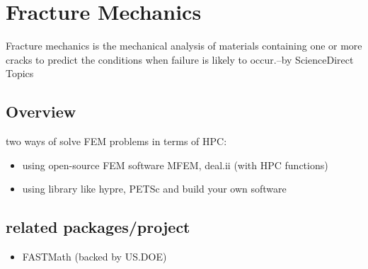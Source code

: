 \section{Fracture Mechanics } 
Fracture mechanics is the mechanical analysis of materials containing one or more cracks to predict the conditions when failure is likely to occur.--by ScienceDirect Topics
\subsection{Overview}
two ways of solve FEM problems in terms of HPC:
\begin{itemize}
	\item using open-source FEM software MFEM\cite{mfem-library}, deal.ii\cite{Arndt-2007-} (with HPC functions) 
	\item using library like hypre, PETSc and build your own software
\end{itemize} 
\subsection{related packages/project}
\begin{itemize}
	\item FASTMath (backed by US.DOE)
\end{itemize}